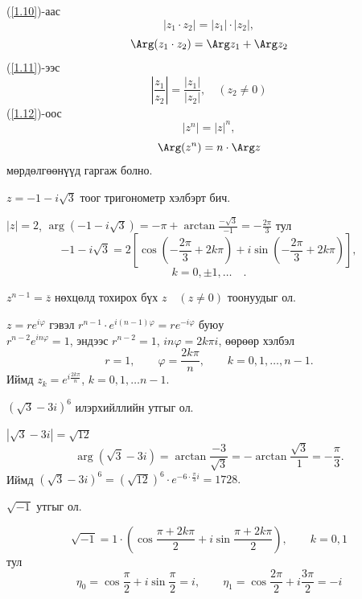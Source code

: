 (\ref{1.10})-аас 
$$|z_1\cdot z_2|=|z_1|\cdot |z_2|,$$
$$\Arg  (z_1\cdot z_2)=\Arg  z_1+\Arg  z_2$$
(\ref{1.11})-ээс 
$$\left|\frac{z_1}{z_2}\right|=\frac{|z_1|}{|z_2|}, \quad (z_2\neq 0)$$
(\ref{1.12})-оос
$$|z^n|=|z|^n,$$
$$\Arg  (z^n)=n\cdot \Arg  z$$
мөрдөлгөөнүүд гаргаж болно.
\begin{exm}
$z=-1-i\sqrt{3}$ тоог тригонометр хэлбэрт бич.
\end{exm}
\begin{sol}
$|z|=2$, $\arg(-1-i\sqrt{3})=-\pi +\arctan \frac{-\sqrt{3}}{-1}=-\frac{2\pi}{3}$ тул 
$$-1-i\sqrt{3}=2\left[\cos\left(-\frac{2\pi}{3}+2k\pi\right) +i\sin \left(-\frac{2\pi}{3}+2k\pi\right)\right],  $$
$$k=0,\pm 1, \ldots \quad .$$
\end{sol}
\begin{exm}
$z^{n-1}=\overline{z}$ нөхцөлд тохирох бүх $z\quad (z\neq 0)$ тоонуудыг ол.
\end{exm}
\begin{sol}
$z=re^{i\varphi}$ гэвэл $r^{n-1}\cdot e^{i(n-1)\varphi}=re^{-i\varphi}$ буюу \\ $r^{n-2}e^{in \varphi}=1$, эндээс $r^{n-2}=1$, $in\varphi =2k\pi i$, өөрөөр хэлбэл $$r=1, \qquad \varphi=\dfrac{2k\pi}{n}, \qquad k=0,1,\ldots, n-1.$$ Иймд $z_k=e^{i\frac{2k\pi}{n}}$, $k=0,1,\ldots n-1.$
\end{sol}
\begin{exm}
$(\sqrt{3}-3i)^6$ илэрхийллийн утгыг ол.
\end{exm}
\begin{sol}
$|\sqrt{3}-3i|=\sqrt{12}$ 
$$\arg  (\sqrt{3}-3i)=\arctan \frac{-3}{\sqrt{3}}=-\arctan \frac{\sqrt{3}}{1}=-\frac{\pi}{3}.$$
Иймд $(\sqrt{3}-3i)^6=(\sqrt{12})^6\cdot e^{-6\cdot \frac{\pi}{3}i}=1728. $
\end{sol}
\begin{exm}
$\sqrt{-1}$ утгыг ол.
\end{exm}
\begin{sol}
$$\sqrt{-1}=1\cdot \left(\cos\frac{\pi+2k\pi}{2}+i\sin\frac{\pi +2k\pi}{2}\right), \qquad k=0,1$$ тул
$$\eta_0=\cos\frac{\pi}{2}+i\sin\frac{\pi}{2}=i, \qquad \eta_1=\cos\frac{2\pi}{2}+i\frac{3\pi}{2}=-i$$
\end{sol}
\newpage
